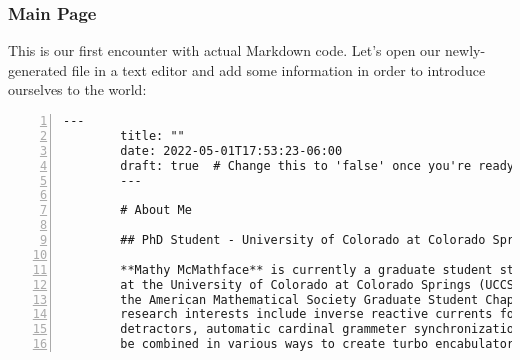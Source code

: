 \begin{frame}[fragile]
    \frametitle{Main Page}
    
    This is our first encounter with actual Markdown code. Let's open our newly-generated file
    in a text editor and add some information in order to introduce ourselves to the world:

    \begin{lstlisting}[style=saneCode,gobble=8,title={content/\_index.md},numbers=left]
        ---
        title: ""
        date: 2022-05-01T17:53:23-06:00
        draft: true  # Change this to 'false' once you're ready to publish this page.
        ---
        
        # About Me
        
        ## PhD Student - University of Colorado at Colorado Springs
        
        **Mathy McMathface** is currently a graduate student studying Mathematics
        at the University of Colorado at Colorado Springs (UCCS) and is an officer in
        the American Mathematical Society Graduate Student Chapter at UCCS. Their
        research interests include inverse reactive currents for use in unilateral phase
        detractors, automatic cardinal grammeter synchronization, and how these two may
        be combined in various ways to create turbo encabulators.
    \end{lstlisting}
\end{frame}